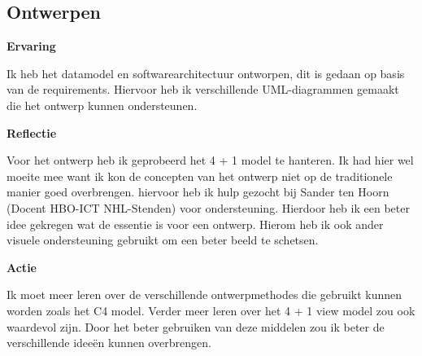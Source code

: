 \subsection{Ontwerpen}
\textbf{Ervaring}

\whitespace
Ik heb het datamodel en softwarearchitectuur ontworpen, dit is gedaan op basis van de requirements.
Hiervoor heb ik verschillende UML-diagrammen gemaakt die het ontwerp kunnen ondersteunen.

\whitespace
\textbf{Reflectie}

\whitespace
Voor het ontwerp heb ik geprobeerd het 4 + 1 model te hanteren. 
Ik had hier wel moeite mee want ik kon de concepten van het ontwerp niet op de traditionele manier goed overbrengen.
hiervoor heb ik hulp gezocht bij Sander ten Hoorn (Docent HBO-ICT NHL-Stenden) voor ondersteuning.
Hierdoor heb ik een beter idee gekregen wat de essentie is voor een ontwerp.  
Hierom heb ik ook ander visuele ondersteuning gebruikt om een beter beeld te schetsen.

\whitespace
\textbf{Actie}

\whitespace
Ik moet meer leren over de verschillende ontwerpmethodes die gebruikt kunnen worden zoals het C4 model.
Verder meer leren over het 4 + 1 view model zou ook waardevol zijn.
Door het beter gebruiken van deze middelen zou ik beter de verschillende ideeën kunnen overbrengen.

